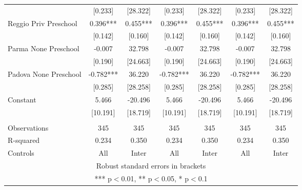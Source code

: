 \begin{tabular}{lcccccc}
 & [0.233] & [28.322] & [0.233] & [28.322] & [0.233] & [28.322] \\
Reggio Priv Preschool & 0.396*** & 0.455*** & 0.396*** & 0.455*** & 0.396*** & 0.455*** \\
 & [0.142] & [0.160] & [0.142] & [0.160] & [0.142] & [0.160] \\
Parma None Preschool & -0.007 & 32.798 & -0.007 & 32.798 & -0.007 & 32.798 \\
 & [0.190] & [24.663] & [0.190] & [24.663] & [0.190] & [24.663] \\
Padova None Preschool & -0.782*** & 36.220 & -0.782*** & 36.220 & -0.782*** & 36.220 \\
 & [0.285] & [28.258] & [0.285] & [28.258] & [0.285] & [28.258] \\
Constant & 5.466 & -20.496 & 5.466 & -20.496 & 5.466 & -20.496 \\
 & [10.191] & [18.719] & [10.191] & [18.719] & [10.191] & [18.719] \\
 &  &  &  &  &  &  \\
Observations & 345 & 345 & 345 & 345 & 345 & 345 \\
R-squared & 0.234 & 0.350 & 0.234 & 0.350 & 0.234 & 0.350 \\
 Controls & All & Inter & All & Inter & All & Inter \\ \hline
\multicolumn{7}{c}{ Robust standard errors in brackets} \\
\multicolumn{7}{c}{ *** p$<$0.01, ** p$<$0.05, * p$<$0.1} \\
\end{tabular}
